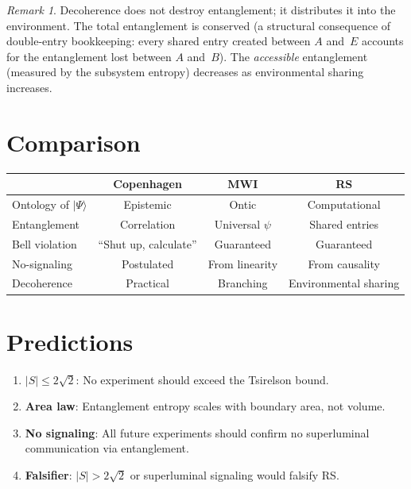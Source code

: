 \documentclass[12pt,a4paper]{article}
\theoremstyle{definition}
\theoremstyle{remark}
\newtheorem{remark}[theorem]{Remark}
\begin{document}
\begin{remark}
Decoherence does not destroy entanglement; it distributes it into
the environment.  The total entanglement is conserved
(a structural consequence of double-entry bookkeeping: every
shared entry created between $A$ and~$E$ accounts for the
entanglement lost between $A$ and~$B$).  The \emph{accessible}
entanglement (measured by the subsystem entropy) decreases as
environmental sharing increases.
\end{remark}

\section{Comparison}
\label{sec:comparison}

\begin{center}
\renewcommand{\arraystretch}{1.3}
\begin{tabular}{@{}lccc@{}}
\toprule
& \textbf{Copenhagen} & \textbf{MWI} & \textbf{RS} \\
\midrule
Ontology of $|\Psi\rangle$ & Epistemic & Ontic & Computational \\
Entanglement & Correlation & Universal $\psi$ &
Shared entries \\
Bell violation & ``Shut up, calculate'' & Guaranteed &
Guaranteed \\
No-signaling & Postulated & From linearity &
From causality \\
Decoherence & Practical & Branching & Environmental sharing \\
\bottomrule
\end{tabular}
\end{center}

\section{Predictions}
\label{sec:predictions}

\begin{enumerate}
  \item \textbf{$|S| \leq 2\sqrt{2}$}: No experiment should
  exceed the Tsirelson bound.

  \item \textbf{Area law}: Entanglement entropy scales with
  boundary area, not volume.

  \item \textbf{No signaling}: All future experiments should
  confirm no superluminal communication via entanglement.

  \item \textbf{Falsifier}: $|S| > 2\sqrt{2}$ or superluminal
  signaling would falsify RS.
\end{enumerate}
\end{document}
